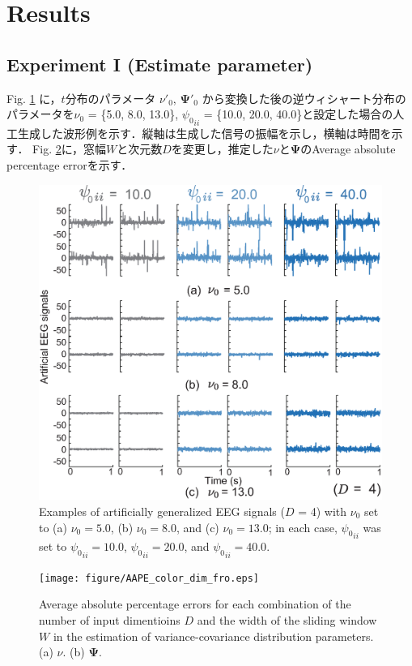 \documentclass[journal]{IEEEtran}
\begin{document}
\section{Results}
\subsection{Experiment I (Estimate parameter)}
Fig. \ref{fig:sim_EEG} に，$t$分布のパラメータ $\nu'_0$, $\mathbf{\Psi}'_0$ から変換した後の逆ウィシャート分布のパラメータを$\nu_0$ = \{5.0, 8.0, 13.0\}, ${\psi_0}_{ii}$ = \{10.0, 20.0, 40.0\}と設定した場合の人工生成した波形例を示す．縦軸は生成した信号の振幅を示し，横軸は時間を示す．
Fig. \ref{fig:ES_param}に，窓幅$W$と次元数$D$を変更し，推定した$\nu$と$\mathbf{\Psi}$のAverage absolute percentage errorを示す．
\begin{figure}[t]
\centering
\includegraphics[width=1.0\hsize]{figure/simulation_EEG_3.eps}
\caption{Examples of artificially generalized EEG signals ($D$ = 4) with $\nu_0$ set to (a) $\nu_0 = 5.0$, (b) $\nu_0 = 8.0$, and (c) $\nu_0 = 13.0$; in each case, ${{\psi_0}_{ii}}$ was set to ${{\psi_0}_{ii}} = 10.0$, ${{\psi_0}_{ii}} = 20.0$, and ${{\psi_0}_{ii}} = 40.0$.}
\label{fig:sim_EEG}
\end{figure}

\begin{figure}[!t]
\centering
\texttt{[image: figure/AAPE\_color\_dim\_fro.eps]}
\caption{Average absolute percentage errors for each combination of the number of input dimentioins $D$ and the width of the sliding window $W$ in the estimation of variance-covariance distribution parameters. (a) $\nu$. (b) $\mathbf{\Psi}$.}
\label{fig:ES_param}
\end{figure}
\end{document}
